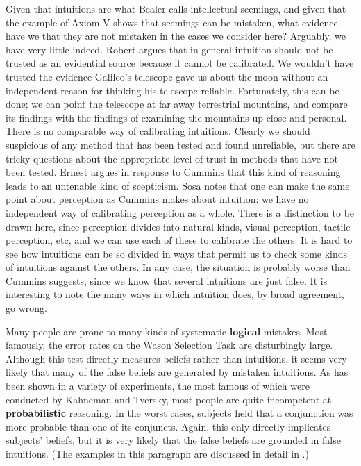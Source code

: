 Given that intuitions are what Bealer calls intellectual seemings, and given that the example of Axiom V shows that seemings can be mistaken, what evidence have we that they are not mistaken in the cases we consider here? Arguably, we have very little indeed. Robert \citet{Cummins1998} argues that in general intuition should not be trusted as an evidential source because it cannot be calibrated. We wouldn't have trusted the evidence Galileo's telescope gave us about the moon without an independent reason for thinking his telescope reliable. Fortunately, this can be done; we can point the telescope at far away terrestrial mountains, and compare its findings with the findings of examining the mountains up close and personal. There is no comparable way of calibrating intuitions. Clearly we should suspicious of any method that has been tested and found unreliable, but there are tricky questions about the appropriate level of trust in methods that have not been tested. Ernest \citet{Sosa1998} argues in response to Cummins that this kind of reasoning leads to an untenable kind of scepticism. Sosa notes that one can make the same point about perception as Cummins makes about intuition: we have no independent way of calibrating perception as a whole. There is a distinction to be drawn here, since perception divides into natural kinds, visual perception, tactile perception, etc, and we can use each of these to calibrate the others. It is hard to see how intuitions can be so divided in ways that permit us to check some kinds of intuitions against the others. In any case, the situation is probably worse than Cummins suggests, since we know that several intuitions are just false. It is interesting to note the many ways in which intuition does, by broad agreement, go wrong. 

Many people are prone to many kinds of systematic \textbf{logical} mistakes. Most famously, the error rates on the Wason Selection Task are disturbingly large. Although this test directly measures beliefs rather than intuitions, it seems very likely that many of the false beliefs are generated by mistaken intuitions. As has been shown in a variety of experiments, the most famous of which were conducted by Kahneman and Tversky, most people are quite incompetent at \textbf{probabilistic }reasoning. In the worst cases, subjects held that a conjunction was more probable than one of its conjuncts. Again, this only directly implicates subjects' beliefs, but it is very likely that the false beliefs are grounded in false intuitions. (The examples in this paragraph are discussed in detail in \citet{Stich1988, Stich1992}.)

